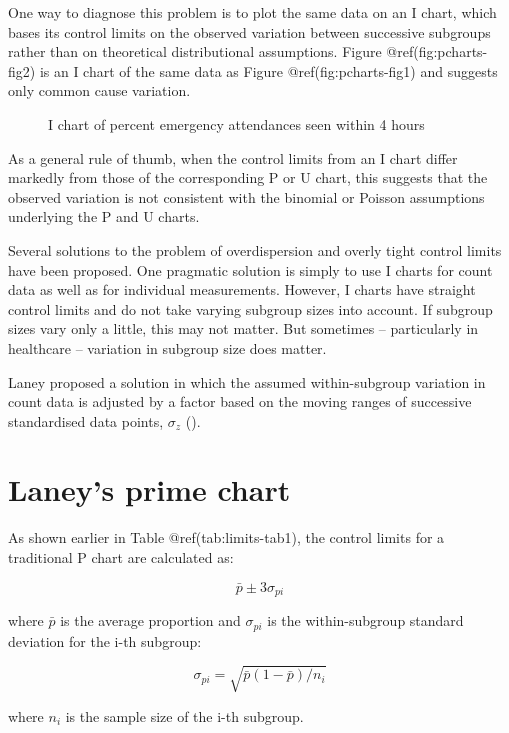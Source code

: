 \documentclass[
]{book}
\makeatletter
\newcommand*\pandocbounded[1]{%
  \sbox\pandoc@box{#1}%
  \Gscale@div\@tempa{\textheight}{\dimexpr\ht\pandoc@box+\dp\pandoc@box\relax}%
  \Gscale@div\@tempb{\linewidth}{\wd\pandoc@box}%
  \ifdim\@tempb\p@<\@tempa\p@\let\@tempa\@tempb\fi%
  \ifdim\@tempa\p@<\p@\scalebox{\@tempa}{\usebox\pandoc@box}%
  \else\usebox{\pandoc@box}%
  \fi%
}
\makeatother
\begin{document}
One way to diagnose this problem is to plot the same data on an I chart,
which bases its control limits on the observed variation between
successive subgroups rather than on theoretical distributional
assumptions. Figure @ref(fig:pcharts-fig2) is an I chart of the same
data as Figure @ref(fig:pcharts-fig1) and suggests only common cause
variation.

\begin{figure}
\centering
\pandocbounded{}
\caption{I chart of percent emergency attendances seen within 4 hours}
\end{figure}

As a general rule of thumb, when the control limits from an I chart
differ markedly from those of the corresponding P or U chart, this
suggests that the observed variation is not consistent with the binomial
or Poisson assumptions underlying the P and U charts.

Several solutions to the problem of overdispersion and overly tight
control limits have been proposed. One pragmatic solution is simply to
use I charts for count data as well as for individual measurements.
However, I charts have straight control limits and do not take varying
subgroup sizes into account. If subgroup sizes vary only a little, this
may not matter. But sometimes -- particularly in healthcare -- variation
in subgroup size does matter.

Laney proposed a solution in which the assumed within-subgroup variation
in count data is adjusted by a factor based on the moving ranges of
successive standardised data points, \(\sigma_z\)
().

\section{Laney's prime chart}\label{laneys-prime-chart}

As shown earlier in Table @ref(tab:limits-tab1), the control limits for
a traditional P chart are calculated as:

\[\bar{p}\pm3\sigma_{pi}\]

where \(\bar{p}\) is the average proportion and \(\sigma_{pi}\) is the
within-subgroup standard deviation for the i-th subgroup:

\[\sigma_{pi}=\sqrt{\bar{p}(1-\bar{p})/{n_{i}}}\]

where \(n_i\) is the sample size of the i-th subgroup.
\end{document}
